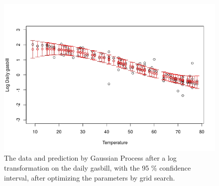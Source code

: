 \documentclass{article}
\begin{document}
\begin{figure}
\includegraphics[width=\textwidth]{util_gp_grid.jpeg}
\caption{The data and prediction by Gaussian Process after a log transformation on the daily gasbill, with the 95 \% confidence interval, after optimizing the parameters by grid search.}
\label{fig:util_log}
\end{figure}
\end{document}
